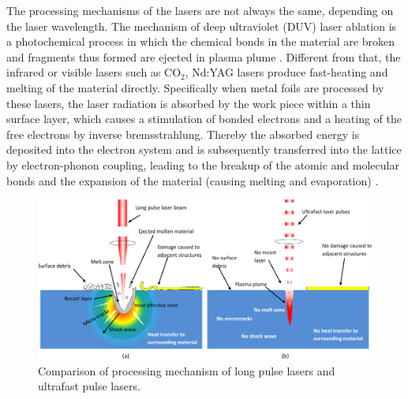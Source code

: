The processing mechanisms of the lasers are not always the same, depending on the laser wavelength. The mechanism of deep ultraviolet (DUV) laser ablation is a photochemical process in which the chemical bonds in the material are broken and fragments thus formed are ejected in plasma plume \cite{lasermicromachining}. Different from that, the infrared or visible lasers such as CO$_2$, Nd:YAG lasers produce fast-heating and melting of the material directly. Specifically when metal foils are processed by these lasers, the laser radiation is absorbed by the work piece within a thin surface layer, which causes a stimulation of bonded electrons and a heating of the free electrons by inverse bremsstrahlung.  Thereby the absorbed energy is deposited into the electron system and is subsequently transferred into the lattice by electron-phonon coupling, leading to the breakup of the atomic and molecular bonds and the expansion of the material (causing melting and evaporation) \cite{ref_4}. 

\begin{figure}[!b]%
\centering
\includegraphics[width=1\textwidth]{figures/literaturereview/figure2_5}%
\caption{Comparison of processing mechanism of long pulse lasers and ultrafast pulse lasers.\cite{ref_4}}%
\label{figure2_5}%
\end{figure}


